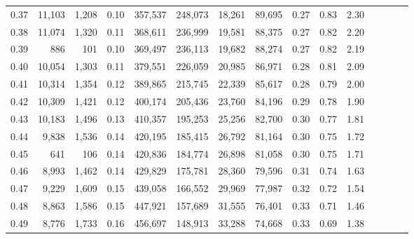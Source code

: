 \begin{tabular}{rrrcrrrrrrrrrrr}
0.37 &  11,103 &  1,208 &                                       0.10 &  357,537 &  248,073 &   18,261 &   89,695 &  0.27 &  0.83 &                         2.30 \\
0.38 &  11,074 &  1,320 &                                       0.11 &  368,611 &  236,999 &   19,581 &   88,375 &  0.27 &  0.82 &                         2.20 \\
0.39 &     886 &    101 &                                       0.10 &  369,497 &  236,113 &   19,682 &   88,274 &  0.27 &  0.82 &                         2.19 \\
0.40 &  10,054 &  1,303 &                                       0.11 &  379,551 &  226,059 &   20,985 &   86,971 &  0.28 &  0.81 &                         2.09 \\
0.41 &  10,314 &  1,354 &                                       0.12 &  389,865 &  215,745 &   22,339 &   85,617 &  0.28 &  0.79 &                         2.00 \\
0.42 &  10,309 &  1,421 &                                       0.12 &  400,174 &  205,436 &   23,760 &   84,196 &  0.29 &  0.78 &                         1.90 \\
0.43 &  10,183 &  1,496 &                                       0.13 &  410,357 &  195,253 &   25,256 &   82,700 &  0.30 &  0.77 &                         1.81 \\
0.44 &   9,838 &  1,536 &                                       0.14 &  420,195 &  185,415 &   26,792 &   81,164 &  0.30 &  0.75 &                         1.72 \\
0.45 &     641 &    106 &                                       0.14 &  420,836 &  184,774 &   26,898 &   81,058 &  0.30 &  0.75 &                         1.71 \\
0.46 &   8,993 &  1,462 &                                       0.14 &  429,829 &  175,781 &   28,360 &   79,596 &  0.31 &  0.74 &                         1.63 \\
0.47 &   9,229 &  1,609 &                                       0.15 &  439,058 &  166,552 &   29,969 &   77,987 &  0.32 &  0.72 &                         1.54 \\
0.48 &   8,863 &  1,586 &                                       0.15 &  447,921 &  157,689 &   31,555 &   76,401 &  0.33 &  0.71 &                         1.46 \\
0.49 &   8,776 &  1,733 &                                       0.16 &  456,697 &  148,913 &   33,288 &   74,668 &  0.33 &  0.69 &                         1.38 \\

\end{tabular}
